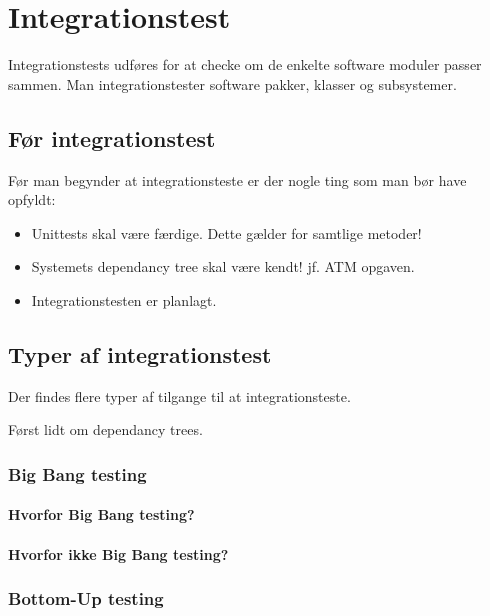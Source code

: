 \section{Integrationstest}
Integrationstests udføres for at checke om de enkelte software moduler passer sammen. Man integrationstester software pakker, klasser og subsystemer.

\subsection{Før integrationstest}
Før man begynder at integrationsteste er der nogle ting som man bør have opfyldt:
\begin{itemize}
	\item Unittests skal være færdige. Dette gælder for samtlige metoder!
	\item Systemets dependancy tree skal være kendt! jf. ATM opgaven.
	\item Integrationstesten er planlagt.
\end{itemize}

\subsection{Typer af integrationstest}
Der findes flere typer af tilgange til at integrationsteste.

Først lidt om dependancy trees. 

\subsubsection{Big Bang testing}

\paragraph{Hvorfor Big Bang testing?}

\paragraph{Hvorfor ikke Big Bang testing?}


\subsubsection{Bottom-Up testing}

